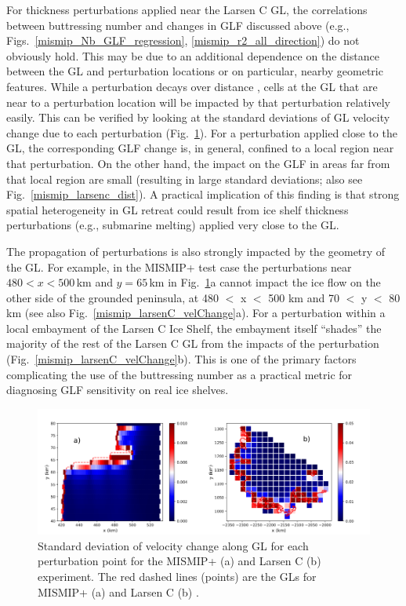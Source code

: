 \documentclass[tc, manuscript]{copernicus}
\begin{document}
For thickness perturbations applied near the Larsen C GL, the correlations between buttressing number and changes in GLF discussed above (e.g., Figs.~\ref{mismip_Nb_GLF_regression}, \ref{mismip_r2_all_direction}) do not obviously hold. This may be due to an additional dependence on the distance between the GL and perturbation locations or on particular, nearby geometric features. While a perturbation decays over distance \citep{lick1970}, cells at the GL  that are near to a perturbation location will be impacted by that perturbation relatively easily. This can be verified by looking at the standard deviations of GL velocity change due to each perturbation (Fig.~\ref{vel_change_std}). For a perturbation applied close to the GL, the corresponding GLF change is, in general, confined to a local region near that perturbation. On the other hand, the impact on the GLF in areas far from that local region are small (resulting in large standard deviations; also see Fig.~\ref{mismip_larsenc_dist}). A practical implication of this finding is that strong spatial heterogeneity in GL retreat could result from ice shelf thickness perturbations (e.g., submarine melting) applied very close to the GL. 

The propagation of perturbations is also strongly impacted by the geometry of the GL. For example, in the MISMIP+ test case the perturbations near $480 < x < 500$\,km and $y = 65$\,km in Fig.~\ref{vel_change_std}a cannot impact the ice flow on the other side of the grounded peninsula, at 480 $<$ x $<$ 500 km and 70 $<$ y $<$ 80 km (see also Fig.~\ref{mismip_larsenC_velChange}a). For a perturbation within a local embayment of the Larsen C Ice Shelf, the embayment itself ``shades'' the majority of the rest of the Larsen C GL from the impacts of the perturbation (Fig.~\ref{mismip_larsenC_velChange}b). This is one of the primary factors complicating the use of the buttressing number as a practical metric for diagnosing GLF sensitivity on  real ice shelves.
 
\begin{figure}
	\centering
    \includegraphics[width=1\linewidth]{figs/vel_change_std.pdf}
    \caption{Standard deviation of velocity change along GL for each perturbation point for the MISMIP+ (a) and Larsen C (b) experiment. The red dashed lines (points) are the GLs for MISMIP+ (a) and Larsen C (b) .}
	\label{vel_change_std}
\end{figure}
\end{document}
